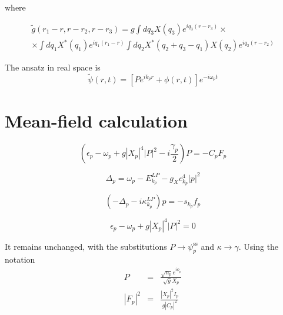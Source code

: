 \documentclass[a4paper,prb,10pt,aps,twocolumn]{revtex4-1}
\begin{document}
where


\begin{multline}
  \label{eq:101}
\tilde{g}\left(r_{1}-r,r-r_{2},r-r_{3}\right)=g\int dq_{3}X(q_{3})e^{iq_{3}\left(r-r_{3}\right)}\times\\\times\int dq_{1}X^{*}(q_{1})e^{iq_{1}\left(r_{1}-r\right)}\int dq_{2}X^{*}(q_{2}+q_{3}-q_{1})X(q_{2})e^{iq_{2}\left(r-r_{2}\right)}  
\end{multline}


The ansatz in real space is
\begin{equation}
  \label{eq:6}
\tilde{\psi}(r,t)=\left[Pe^{ik_{p}r}+\phi(r,t)\right]e^{-i\omega_{p}t}
\end{equation}


\section{Mean-field calculation}

\begin{equation}
  \label{eq:7}
\left(\epsilon_{p}-\omega_{p}+g\left|X_{p}\right|^{4}\left|P\right|^{2}-i\frac{\gamma_{p}}{2}\right)P=-C_{p}F_{p}
\end{equation}

\begin{equation}
  \label{eq:9}
  \Delta_{p}=\omega_{p}-E_{k_{p}}^{LP}-g_{X}c_{k_{p}}^{4}|p|^{2}
\end{equation}

\begin{equation}
  \label{eq:8}
  \left(-\Delta_{p}-i\kappa_{k_{p}}^{LP}\right)p=-s_{k_{p}}f_{p}
\end{equation}



\begin{equation}
  \label{eq:11}
\epsilon_{p}-\omega_{p}+g\left|X_{p}\right|^{4}\left|P\right|^{2}=0
\end{equation}


It remains unchanged, with the substitutions
$P \rightarrow \psi^{\text{ss}}_p$ and $\kappa \rightarrow \gamma$.
Using the notation
\begin{subequations}
  \begin{eqnarray}
    \label{eq:102}
  P&=&\frac{\sqrt{n_{p}}e^{i\phi_{p}}}{\sqrt{g}X_{p}}\\
\left|F_{p}\right|^{2}&=&\frac{\left|X_{p}\right|^{2}I_{p}}{g\left|C_{p}\right|^{2}}
  \end{eqnarray}
\end{subequations}
\end{document}
